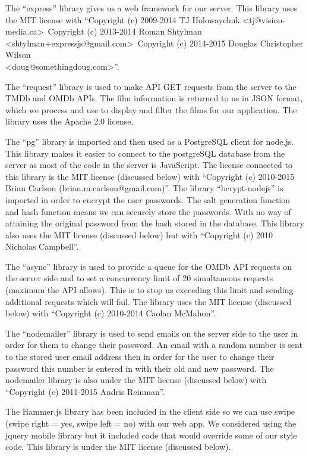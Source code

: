 \documentclass{article}
\begin{document}
The “express” library gives us a web framework for our server. This library uses the MIT license with “Copyright (c) 2009-2014 TJ Holowaychuk \textless tj@vision-media.ca\textgreater \  Copyright (c) 2013-2014 Roman Shtylman \textless shtylman+expressjs@gmail.com\textgreater \ Copyright (c) 2014-2015 Douglas Christopher Wilson \\ \textless doug@somethingdoug.com\textgreater ”.

The “request” library is used to make API GET requests from the server to the TMDb and OMDb APIs. The film information is returned to us in JSON format, which we process and use to display and filter the films for our application. The library uses the Apache 2.0 license.

The “pg” library is imported and then used as a PostgreSQL client for node.js. This library makes it easier to connect to the postgreSQL database from the server as most of the code in the server is JavaScript. The license connected to this library is the MIT license (discussed below) with “Copyright (c) 2010-2015 Brian Carlson (brian.m.carlson@gmail.com)”. 
The library “bcrypt-nodejs” is imported in order to encrypt the user passwords. The salt generation function and hash function means we can securely store the passwords. With no way of attaining the original password from the hash stored in the database. This library also uses the MIT license  (discussed below) but with “Copyright (c) 2010 Nicholas Campbell”. 

The “async” library is used to provide a queue for the OMDb API requests on the server side and to set a concurrency limit of 20 simultaneous requests (maximum the API allows). This is to stop us exceeding this limit and sending additional requests which will fail. The library uses the MIT license (discussed below) with “Copyright (c) 2010-2014 Caolan McMahon”.

The “nodemailer” library is used to send emails on the server side to the user in order for them to change their password. An email with a random number is sent to the stored user email address then in order for the user to change their password this number is entered in with their old and new password. The nodemailer library is also under the MIT license (discussed below) with “Copyright (c) 2011-2015 Andris Reinman”. 



The Hammer.js library has been included in the client side so we can use swipe (swipe right = yes, swipe left = no) with our web app. We considered using the jquery mobile library but it included code that would override some of our style code. This library is under the MIT license (discussed below).
\end{document}
